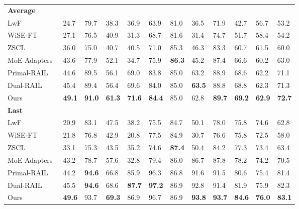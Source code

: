 \documentclass{article}
\theoremstyle{plain}
\theoremstyle{definition}
\theoremstyle{remark}
\begin{document}
\begin{table}[!ht]
\begin{tabular}{b{15em}b{1.6em}b{1.6em}b{1.6em}b{1.6em}b{1.6em}b{1.6em}b{1.6em}b{1.6em}b{1.6em}b{1.6em}>{\centering\arraybackslash}m{3em}}
    \midrule
        \multicolumn{11}{l}{\textbf{Average}}\\
          \quad LwF~\cite{li2017learning}& 24.7 & 79.7 & 38.3 & 36.9 & 63.9 & 81.0 & 36.5 & 71.9 & 42.7 & 56.7& {\cellcolor{lightgrey}}53.2\\
          \quad WiSE-FT~\cite{wortsman2022robust}& 27.1 & 76.5 & 40.9 & 31.3 & 68.7 & 81.6 & 31.4 & 74.7 & 51.7 & 58.4 & {\cellcolor{lightgrey}}54.2\\
          \quad ZSCL~\cite{zheng2023preventing}& 36.0 & 75.0 & 40.7 & 40.5 & 71.0 & 85.3 & 46.3 & 83.3 & 60.7 & 61.5 & {\cellcolor{lightgrey}}60.0\\
          \quad MoE-Adapters~\cite{yu2024boosting} & 43.6 & 77.9 & 52.1 & 34.7 & 75.9 & \textbf{86.3} & 45.2 & 87.4 & 66.6 & 60.2 & {\cellcolor{lightgrey}}63.0\\
          \quad Primal-RAIL~\cite{xu2024advancing} & 44.6 & 89.5 & 56.1 & 69.0 & 83.8 & 85.0 & 63.2 & 88.9 & 68.6 & 62.2 & {\cellcolor{lightgrey}}71.1\\
          \quad Dual-RAIL~\cite{xu2024advancing} & 45.4 & 89.4 & 56.4 & 69.6 & 84.0 & 85.0 & \textbf{63.5} & 88.8 & 68.8 & 62.3 & {\cellcolor{lightgrey}}71.3\\
          \quad Ours & \textbf{49.1} & \textbf{91.0} & \textbf{61.3} & \textbf{71.6} & \textbf{84.4} & 85.0 & 62.8 & \textbf{89.7} & \textbf{69.2} & \textbf{62.9} & {\cellcolor{lightgrey}}\textbf{72.7}\\
    \midrule
        \multicolumn{11}{l}{\textbf{Last}}\\
          \quad LwF~\cite{li2017learning}& 20.9 & 83.1 & 47.5 & 38.2 & 75.5 & 84.7 & 50.1 & 78.0 & 75.8 & 74.6& {\cellcolor{lightgrey}}62.8\\
          \quad WiSE-FT~\cite{wortsman2022robust}& 21.8 & 76.8 & 42.9 & 20.8 & 77.5 & 84.9 & 30.7 & 76.6 & 75.8 & 72.5 & {\cellcolor{lightgrey}}58.0\\
          \quad ZSCL~\cite{zheng2023preventing}& 33.1 & 75.3 & 43.5 & 35.2 & 74.6 & \textbf{87.4} & 50.4 & 84.2 & 77.3 & 73.4 & {\cellcolor{lightgrey}}63.4\\
          \quad MoE-Adapters~\cite{yu2024boosting} & 43.2 & 78.7 & 57.6 & 32.8 & 79.4 & 86.0 & 86.7 & 87.8 & 78.2 & 74.2 & {\cellcolor{lightgrey}}70.5\\
          \quad Primal-RAIL~\cite{xu2024advancing} & 44.2 & \textbf{94.6} & 66.8 & 85.9 & 96.3 & 86.8 & 91.6 & 91.5 & 80.6 & 75.4 & {\cellcolor{lightgrey}}81.4\\
          \quad Dual-RAIL~\cite{xu2024advancing} & 45.5 & \textbf{94.6} & 68.6 & \textbf{87.7} & \textbf{97.2} & 86.9 & 92.8 & 91.4 & 81.9 & 75.9 & {\cellcolor{lightgrey}}82.3\\
          \quad Ours & \textbf{49.6} & 93.7 & \textbf{69.3} & 86.9 & 96.7 & 86.9 & \textbf{93.8} & \textbf{93.7} & \textbf{84.6} & \textbf{76.0} & {\cellcolor{lightgrey}}\textbf{83.1}\\
    \bottomrule
    \end{tabular}
\end{table}
\end{document}
